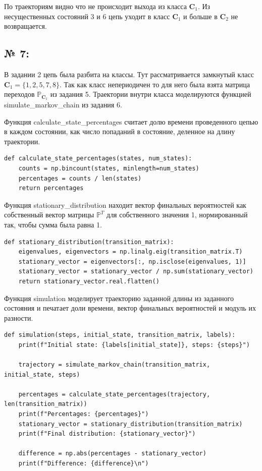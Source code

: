 \documentclass[12pt]{spbstu-task}
\begin{document}
По траекториям видно что не происходит выхода из класса \(\mathbf{C}_1\).
Из несущественных состояний 3 и 6 цепь уходит в класс \(\mathbf{C}_1\) и
больше в \(\mathbf{C}_2\) не возвращается.

\subsection*{№ 7:}
В задании 2 цепь была разбита на классы. Тут рассматривается замкнутый класс
\(\mathbf{C}_1 = \{1, 2, 5, 7, 8\}\). Так как класс
непериодичен то для него была взята матрица переходов \(\mathbb{P}_{\mathbf{C}_1}\)
из задания 5. Траектории внутри класса моделируются
функцией simulate\_markov\_chain из задания 6.

Функция calculate\_state\_percentages считает долю времени проведенного
цепью в каждом состоянии, как число попаданий в состояние, деленное на длину траектории.
\begin{lstlisting}[caption={Функция подсчета доли времени в каждом состоянии}]
def calculate_state_percentages(states, num_states):
    counts = np.bincount(states, minlength=num_states)
    percentages = counts / len(states)
    return percentages
\end{lstlisting}

Функция stationary\_distribution находит вектор финальных вероятностей как
собственный вектор матрицы \(\mathbb{P}^T\) для собственного значения 1, нормированный
так, чтобы сумма была равна 1.
\begin{lstlisting}[caption={Функция нахождения вектора финальных вероятностей}]
def stationary_distribution(transition_matrix):
    eigenvalues, eigenvectors = np.linalg.eig(transition_matrix.T)
    stationary_vector = eigenvectors[:, np.isclose(eigenvalues, 1)]
    stationary_vector = stationary_vector / np.sum(stationary_vector)
    return stationary_vector.real.flatten()
\end{lstlisting}

Функция simulation моделирует траекторию заданной длины из заданного
состояния и печатает доли времени, вектор финальных вероятностей и модуль их разности.
\begin{lstlisting}[caption={Функция моделирования и сравнения с финальными вероятностями}]
def simulation(steps, initial_state, transition_matrix, labels):
    print(f"Initial state: {labels[initial_state]}, steps: {steps}")

    trajectory = simulate_markov_chain(transition_matrix, initial_state, steps)

    percentages = calculate_state_percentages(trajectory, len(transition_matrix))
    print(f"Percentages: {percentages}")
    stationary_vector = stationary_distribution(transition_matrix)
    print(f"Final distribution: {stationary_vector}")

    difference = np.abs(percentages - stationary_vector)
    print(f"Difference: {difference}\n")
\end{lstlisting}
\end{document}
